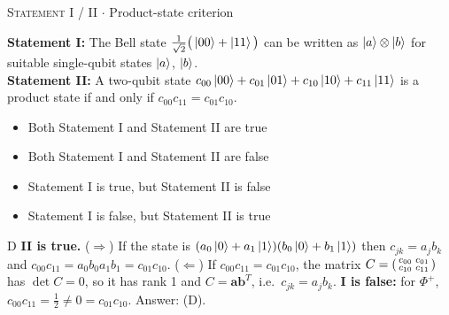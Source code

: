 \documentclass[11pt,a4paper]{article}
\newcommand{\optlabel}[1]{\textbf{(#1)}}
\newcommand{\correctlabel}[1]{\textcolor{okgreen}{\textbf{(#1)}\,\ding{51}}}
\newenvironment{qitem}[1]{\begin{list}{}{\setlength{\leftmargin}{3.3em}\setlength{\labelwidth}{3.1em}%
  \setlength{\labelsep}{0.2em}\setlength{\topsep}{3pt}\setlength{\parsep}{3pt}}\item[\textbf{Q.#1}\hfill]}{\end{list}}
\newcommand{\qsep}{\par\vspace{2pt}{\color{black!15}\hrule}\vspace{4pt}}
\newcommand{\qmeta}[2]{{\footnotesize\color{black!60}\textsc{#1} \;$\cdot$\; #2}\par}
\begin{document}
\begin{qitem}{38}
\qmeta{Statement I / II}{Product-state criterion}
\textbf{Statement I:} The Bell state $\frac{1}{\sqrt2}\big(\ket{00} + \ket{11}\big)$ can be written as $\ket{a}\otimes\ket{b}$ for
suitable single-qubit states $\ket a$, $\ket b$.\\[1mm]
\textbf{Statement II:} A two-qubit state $c_{00}\ket{00} + c_{01}\ket{01} + c_{10}\ket{10} + c_{11}\ket{11}$ is a product state if and only
if $c_{00}c_{11} = c_{01}c_{10}$.
\begin{itemize}[leftmargin=2.6em, labelsep=0.4em, itemsep=2pt, topsep=3pt]
\item[\optlabel{A}] Both Statement I and Statement II are true
\item[\optlabel{B}] Both Statement I and Statement II are false
\item[\optlabel{C}] Statement I is true, but Statement II is false
\item[\correctlabel{D}] Statement I is false, but Statement II is true
\end{itemize}
\end{qitem}
\begin{solbox}{D}
\textbf{II is true.} ($\Rightarrow$) If the state is $(a_0\ket0 + a_1\ket1)(b_0\ket0 + b_1\ket1)$ then $c_{jk} = a_jb_k$ and
$c_{00}c_{11} = a_0b_0a_1b_1 = c_{01}c_{10}$. ($\Leftarrow$) If $c_{00}c_{11} = c_{01}c_{10}$, the matrix $C = \begin{psmallmatrix}c_{00}&c_{01}\\ c_{10}&c_{11}\end{psmallmatrix}$
has $\det C = 0$, so it has rank 1 and $C = \mathbf{a}\mathbf{b}^T$, i.e.\ $c_{jk} = a_jb_k$.
\textbf{I is false:} for $\Phi^+$, $c_{00}c_{11} = \frac12 \neq 0 = c_{01}c_{10}$. Answer: (D).
\end{solbox}
\qsep
\end{document}
